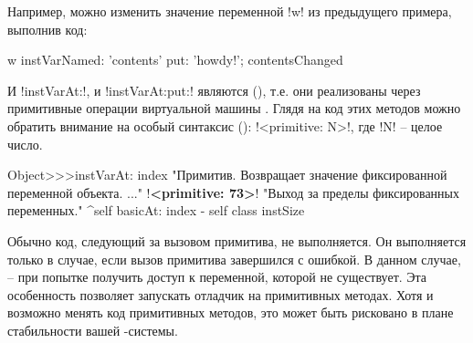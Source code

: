 \documentclass[a4paper,10pt,twoside]{book}
\begin{document}
Например, можно изменить значение переменной \ct!w! из предыдущего примера, выполнив код:
\begin{code}{}
w instVarNamed: 'contents' put: 'howdy!'; contentsChanged
\end{code}


И \ct!instVarAt:!, и \ct!instVarAt:put:! являются  (), т.е. они реализованы через примитивные операции виртуальной машины \pharo.
Глядя на код этих методов можно обратить внимание на особый синтаксис  (): \ct!<primitive: N>!, где \ct!N! -- целое число.

\begin{code}{}
Object>>>instVarAt: index 
	"Примитив. Возвращает значение фиксированной переменной объекта. ..."
	!\textbf{<primitive: 73>}!
	"Выход за пределы фиксированных переменных."
	^self basicAt: index - self class instSize		
\end{code}

Обычно код, следующий за вызовом примитива, не выполняется.
Он выполняется только в случае, если вызов примитива завершился с ошибкой. В данном случае, -- при попытке получить доступ к переменной, которой не существует.
Эта особенность позволяет запускать отладчик на примитивных методах.
Хотя и возможно менять код примитивных методов, это может быть рисковано в плане стабильности вашей \pharo-системы.
\end{document}
